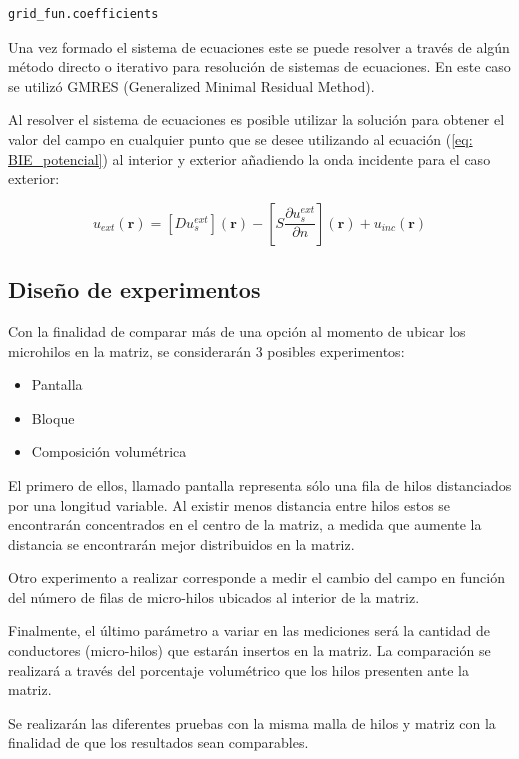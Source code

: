 \documentclass[12pt,letterpaper]{article}
\numberwithin{equation}{section}
\begin{document}
\begin{lstlisting}
grid_fun.coefficients
\end{lstlisting} 

Una vez formado el sistema de ecuaciones este se puede resolver a través de algún método directo o iterativo para resolución de sistemas de ecuaciones. En este caso se utilizó GMRES (Generalized Minimal Residual Method).

Al resolver el sistema de ecuaciones es posible utilizar la solución para obtener el valor del campo en cualquier punto que se desee utilizando al ecuación (\ref{eq: BIE_potencial}) al interior y exterior añadiendo la onda incidente para el caso exterior:

$$u_{ext}(\textbf{r})=\left[D u^{ext}_s\right](\textbf{r}) - \left[S \frac{\partial u^{ext}_s}{\partial n}\right](\textbf{r}) + u_{inc}(\textbf{r})$$
\subsection{Diseño de experimentos}
Con la finalidad de comparar más de una opción al momento de ubicar los microhilos en la matriz, se considerarán 3 posibles experimentos:

\begin{itemize}
	\item Pantalla
	\item Bloque
	\item Composición volumétrica
\end{itemize}

El primero de ellos, llamado pantalla representa sólo una fila de hilos distanciados por una longitud variable. Al existir menos distancia entre hilos estos se encontrarán concentrados en el centro de la matriz, a medida que aumente la distancia se encontrarán mejor distribuidos en la matriz.

Otro experimento a realizar corresponde a medir el cambio del campo en función del número de filas de micro-hilos ubicados al interior de la matriz.

Finalmente, el último parámetro a variar en las mediciones será la cantidad de conductores (micro-hilos) que estarán insertos en la matriz. La comparación se realizará a través del porcentaje volumétrico que los hilos presenten ante la matriz. 

Se realizarán las diferentes pruebas con la misma malla de hilos y matriz con la finalidad de que los resultados sean comparables.
\end{document}
